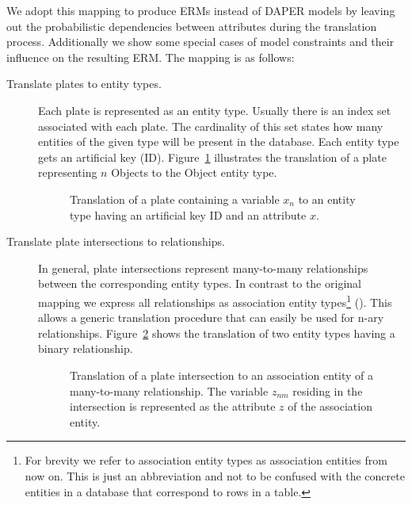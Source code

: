We adopt this mapping to produce ERMs instead of DAPER models by leaving out the probabilistic dependencies between attributes during the translation process. Additionally we show some special cases of model constraints and their influence on the resulting ERM. The mapping is as follows:

\begin{description}
\item[Translate plates to entity types.] Each plate is represented as an entity type. Usually there is an index set associated with each plate. The cardinality of this set states how many entities of the given type will be present in the database. Each entity type gets an artificial key (ID). Figure~\ref{fig:pm2erm_uno_local} illustrates the translation of a plate representing $n$ Objects to the Object entity type.

\begin{figure}[t]
\centering
\scalebox{\tikzScale}{\adjustTikzSize }
\caption[Translation of a plate containing a single variable to an ERM]{Translation of a plate containing a variable $x_n$ to an entity type having an artificial key ID and an attribute $x$.}\label{fig:pm2erm_uno_local}
\end{figure}

\item[Translate plate intersections to relationships.] In general, plate intersections represent many-to-many relationships between the corresponding entity types. In contrast to the original mapping we express all relationships as association entity types\footnote{For brevity we refer to association entity types as association entities from now on. This is just an abbreviation and not to be confused with the concrete entities in a database that correspond to rows in a table.} (\cite[p.~86-88]{elmasri2007database}). This allows a generic translation procedure that can easily be used for n-ary relationships. Figure~\ref{fig:pm2erm_bi_noconstraints} shows the translation of two entity types having a binary relationship.

\begin{figure}[t]
\centering
\scalebox{\tikzScale}{\adjustTikzSize }
\caption[Translation of a plate intersection to an ERM]{Translation of a plate intersection to an association entity of a many-to-many relationship. The variable $z_{nm}$ residing in the intersection is represented as the attribute $z$ of the association entity.}\label{fig:pm2erm_bi_noconstraints}
\end{figure}


\end{description}
